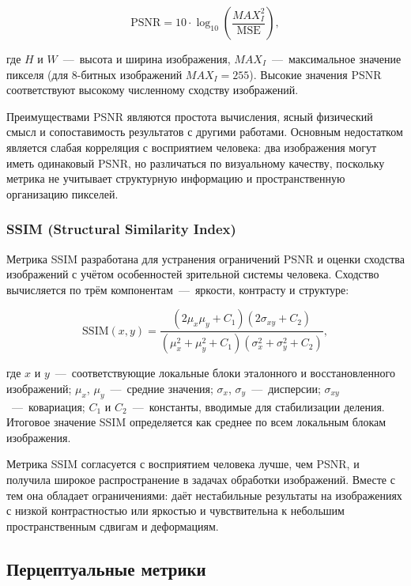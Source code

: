 \begin{equation}
	\text{PSNR} = 10 \cdot \log_{10}\left(\frac{MAX_I^2}{\text{MSE}}\right),
\end{equation}

где $H$ и $W$~---~высота и ширина изображения, $MAX_I$~---~максимальное значение пикселя (для 8-битных изображений $MAX_I = 255$). Высокие значения PSNR соответствуют высокому численному сходству изображений.

Преимуществами PSNR являются простота вычисления, ясный физический смысл и сопоставимость результатов с другими работами. Основным недостатком является слабая корреляция с восприятием человека: два изображения могут иметь одинаковый PSNR, но различаться по визуальному качеству, поскольку метрика не учитывает структурную информацию и пространственную организацию пикселей.

\subsubsection*{SSIM (Structural Similarity Index)}

Метрика SSIM разработана для устранения ограничений PSNR и оценки сходства изображений с учётом особенностей зрительной системы человека. Сходство вычисляется по трём компонентам~---~яркости, контрасту и структуре:

\begin{equation}
	\text{SSIM}(x, y) = \frac{(2\mu_x\mu_y + C_1)(2\sigma_{xy} + C_2)}{(\mu_x^2 + \mu_y^2 + C_1)(\sigma_x^2 + \sigma_y^2 + C_2)},
\end{equation}

где $x$ и $y$~---~соответствующие локальные блоки эталонного и восстановленного изображений; $\mu_x$, $\mu_y$~---~средние значения; $\sigma_x$, $\sigma_y$~---~дисперсии; $\sigma_{xy}$~---~ковариация; $C_1$ и $C_2$~---~константы, вводимые для стабилизации деления. Итоговое значение SSIM определяется как среднее по всем локальным блокам изображения.

Метрика SSIM согласуется с восприятием человека лучше, чем PSNR, и получила широкое распространение в задачах обработки изображений. Вместе с тем она обладает ограничениями: даёт нестабильные результаты на изображениях с низкой контрастностью или яркостью и чувствительна к небольшим пространственным сдвигам и деформациям.

\subsection*{Перцептуальные метрики}

